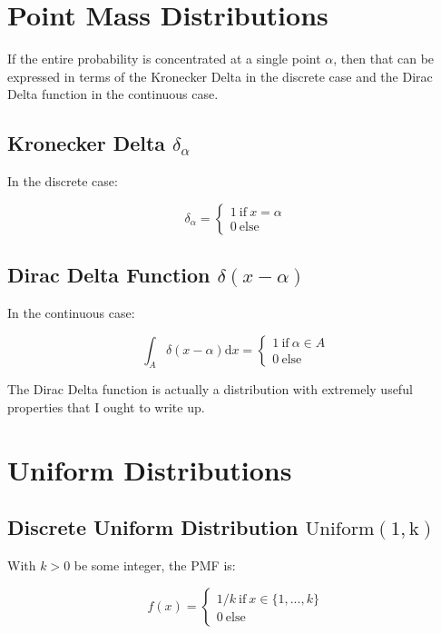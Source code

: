 \section{Point Mass Distributions}

If the entire probability is concentrated at a single point $\alpha$, then that can be expressed in terms of the Kronecker Delta in the discrete case and the Dirac Delta function in the continuous case.

\subsection{Kronecker Delta $\delta_{\alpha}$}
In the discrete case:

\begin{equation}
\delta_{\alpha} = \left\{\begin{array}{l} 1\mathrm{\ if\ }x = \alpha \\ 0\mathrm{\ else}\end{array} \right.
\end{equation}

\subsection{Dirac Delta Function $\delta(x-\alpha)$}
In the continuous case:

\begin{equation}
\int_A \delta(x-\alpha) \mathrm{d}x = \left\{\begin{array}{l} 1\mathrm{\ if\ }\alpha \in A \\ 0\mathrm{\ else}\end{array} \right.
\end{equation}

The Dirac Delta function is actually a distribution with extremely useful properties that I ought to write up. 

\section{Uniform Distributions}

\subsection{Discrete Uniform Distribution $\mathrm{Uniform(1,k)}$}
With $k>0$ be some integer, the PMF is:

\begin{equation}
f(x) = \left\{\begin{array}{l} 1/k \mathrm{\ if\ }x \in \{1,...,k\} \\ 0\mathrm{\ else}\end{array} \right.
\end{equation}

